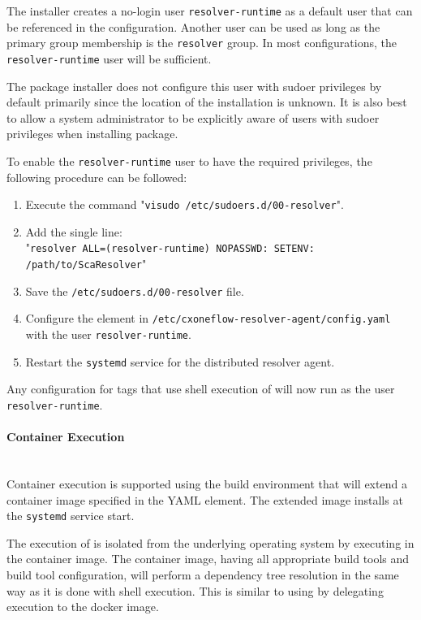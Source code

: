 The installer creates a no-login user \texttt{resolver-runtime} as a default user that can be referenced in the 
configuration.  Another user can be used as long as the primary group membership is the \texttt{resolver} group.  In most configurations, 
the \texttt{resolver-runtime} user will be sufficient.

The package installer does not configure this user with sudoer privileges by default primarily since the location of the \scaresolver
installation is unknown.  It is also best to allow a system administrator to be explicitly aware of users with sudoer privileges when installing
package.

To enable the \texttt{resolver-runtime} user to have the required privileges, the following procedure can be followed:

\begin{enumerate}
  \item Execute the command "\texttt{visudo /etc/sudoers.d/00-resolver}".
  \item Add the single line:\\"\texttt{resolver ALL=(resolver-runtime) NOPASSWD: SETENV: /path/to/ScaResolver}"
  \item Save the \texttt{/etc/sudoers.d/00-resolver} file.
  \item Configure the element  in \texttt{/etc/cxoneflow-resolver-agent/config.yaml} 
  with the user \texttt{resolver-runtime}.
  \item Restart the \texttt{systemd} service for the distributed resolver agent.
\end{enumerate}

Any configuration for tags that use shell execution of \scaresolver will now run as the user\\\texttt{resolver-runtime}.

\paragraph{Container Execution}
\noindent\\Container execution is supported using the \toolkit build environment that will extend a container image
specified in the  YAML element.  The extended image
installs \scaresolver at the \texttt{systemd} service start.

The execution of \scaresolver is isolated from the underlying operating system by executing in the container image.
The container image, having all appropriate build tools and build tool configuration, will perform a dependency
tree resolution in the same way as it is done with shell execution.  This is similar to using
 by delegating execution to the docker image.

